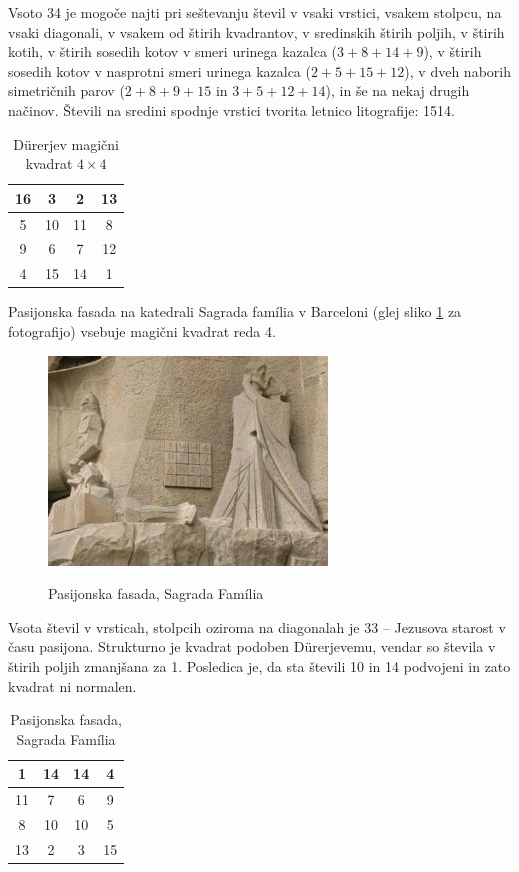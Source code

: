 \documentclass[a4paper,12pt]{article}
\begin{document}
Vsoto 34 je mogoče najti pri seštevanju števil v vsaki vrstici, vsakem stolpcu,
na vsaki diagonali, v vsakem od štirih kvadrantov, v sredinskih štirih poljih,
v štirih kotih, v štirih sosedih kotov v smeri urinega kazalca ($3+8+14+9$), v
štirih sosedih kotov v nasprotni smeri urinega kazalca ($2+5+15+12$), v dveh naborih
simetričnih parov ($2+8+9+15$ in $3+5+12+14$), in še na nekaj drugih načinov.
Števili na sredini spodnje vrstici tvorita letnico litografije: 1514.
%

\begin{table}[ht!]
   \centering
   \large
   \caption{Dürerjev magični kvadrat $4\times 4$}
   \begin{tabular}{|c|c|c|c|}
      \hline
      16 &  3 &  2 & 13 \\\hline
      5 & 10 & 11 &  8 \\\hline
      9 &  6 &  7 & 12 \\\hline
      4 & 15 & 14 &  1 \\\hline
   \end{tabular}
   \label{table:durer}
\end{table}
Pasijonska fasada na katedrali Sagrada família v Barceloni
(glej sliko \ref{fig:sagrada} za fotografijo) vsebuje magični kvadrat reda 4.


\begin{figure}[ht!]
   \centering
   \caption{Pasijonska fasada, Sagrada Família}
   \includegraphics{sagrada.png}
   \label{fig:sagrada}
\end{figure}


Vsota števil v vrsticah, stolpcih oziroma na diagonalah je 33 -- Jezusova starost
v času pasijona. Strukturno je kvadrat podoben Dürerjevemu, vendar so števila
v štirih poljih zmanjšana za 1. Posledica je, da sta števili 10 in 14 podvojeni
in zato kvadrat ni normalen.


\begin{table}[ht!]
   \centering
   \large
   \caption{Pasijonska fasada, Sagrada Família}
   \begin{tabular}{|c|c|c|c|}
      \hline
      1 & 14 & 14 &  4 \\\hline
      11 &  7 &  6 &  9 \\\hline
      8 & 10 & 10 &  5 \\\hline
      13 &  2 &  3 & 15 \\\hline
   \end{tabular}
   \label{table:sagrada}
\end{table}
\end{document}
